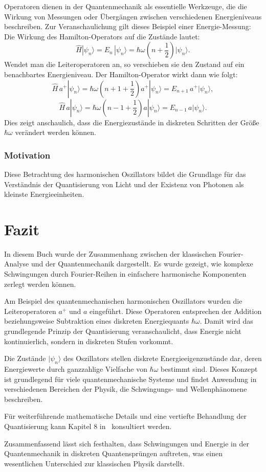 			Operatoren dienen in der Quantenmechanik als essentielle Werkzeuge, die die Wirkung von Messungen oder Übergängen zwischen verschiedenen Energieniveaus beschreiben.
			Zur Veranschaulichung gilt dieses Beispiel einer Energie-Messung:
			Die Wirkung des Hamilton-Operators auf die Zustände lautet:
			\[
				\hat{H} |\psi_n\rangle = E_n\, |\psi_n\rangle = \hbar\omega\left(n + \frac{1}{2}\right) |\psi_n\rangle.
			\]
			Wendet man die Leiteroperatoren an, so verschieben sie den Zustand auf ein benachbartes Energieniveau.
			Der Hamilton-Operator wirkt dann wie folgt:
			\[
				\hat{H}\, a^+ |\psi_n\rangle = \hbar\omega\left(n + 1 + \frac{1}{2}\right) a^+|\psi_n\rangle = E_{n+1}\, a^+|\psi_n\rangle,
			\]
			\[
				\hat{H}\, a |\psi_n\rangle = \hbar\omega\left(n - 1 + \frac{1}{2}\right) a|\psi_n\rangle = E_{n-1}\, a|\psi_n\rangle.
			\]
			Dies zeigt anschaulich, dass die Energiezustände in diskreten Schritten der Größe \(\hbar\omega\) verändert werden können.

		\subsubsection{Motivation}
			Diese Betrachtung des harmonischen Oszillators bildet die Grundlage für das Verständnis der Quantisierung von Licht und der Existenz von Photonen als kleinste Energieeinheiten.

\section{Fazit\label{fourier:section:fazit}}
	In diesem Buch wurde der Zusammenhang zwischen der klassischen Fourier-Analyse und der Quantenmechanik dargestellt.
	Es wurde gezeigt, wie komplexe Schwingungen durch Fourier-Reihen in einfachere harmonische Komponenten zerlegt werden können.

	Am Beispiel des quantenmechanischen harmonischen Oszillators wurden die Leiteroperatoren $a^+$ und $a$ eingeführt.
	Diese Operatoren entsprechen der Addition beziehungsweise Subtraktion eines diskreten Energiequants $\hbar \omega$.
	Damit wird das grundlegende Prinzip der Quantisierung veranschaulicht, dass Energie nicht kontinuierlich, sondern in diskreten Stufen vorkommt.

	Die Zustände $|\psi_n\rangle$ des Oszillators stellen diskrete Energieeigenzustände dar, deren Energiewerte durch ganzzahlige Vielfache von $\hbar \omega$ bestimmt sind.
	Dieses Konzept ist grundlegend für viele quantenmechanische Systeme und findet Anwendung in verschiedenen Bereichen der Physik, die Schwingungs- und Wellenphänomene beschreiben.

	Für weiterführende mathematische Details und eine vertiefte Behandlung der Quantisierung kann Kapitel 8 in~\cite{fourier:quantenmechanik} konsultiert werden.

	Zusammenfassend lässt sich festhalten, dass Schwingungen und Energie in der Quantenmechanik in diskreten Quantensprüngen auftreten, was einen wesentlichen Unterschied zur klassischen Physik darstellt.
